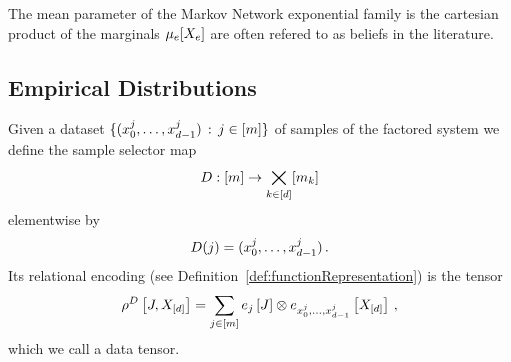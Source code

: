The mean parameter of the Markov Network exponential family is the cartesian product of the marginals $\mu_e[X_{e}]$ are often refered to as beliefs in the literature.



\subsection{Empirical Distributions}\label{sec:empDistribution}


%
%
%
%
%
%

\begin{definition}\label{def:dataMap}
	Given a dataset $\{({x_{0}^{j},\ldots,x_{d-1}^{j}}) \, : \, j\in[m] \}$ of samples of the factored system we define the sample selector map
		\[ D : [m] \rightarrow \bigtimes_{k\in[d]}[m_{k}] \]
	elementwise by 
		\[ D(j) = ({x_{0}^{j},\ldots,x_{d-1}^{j}}) \, . \]
	Its relational encoding (see Definition~\ref{def:functionRepresentation}) is the tensor
		\[ \rho^{D}\left[J,X_{[d]}\right] = \sum_{j\in[m]} e_{j}\left[J\right] \otimes e_{{x_{0}^{j},\ldots,x_{d-1}^{j}}}\left[X_{[d]}\right] \, , \]
	which we call a data tensor.
\end{definition}

